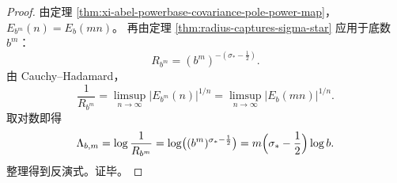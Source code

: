 \begin{proof}
由定理 \ref{thm:xi-abel-powerbase-covariance-pole-power-map}，\(E_{b^m}(n)=E_b(mn)\)。
再由定理 \ref{thm:radius-captures-sigma-star} 应用于底数 \(b^m\)：
\[
R_{b^m}=(b^m)^{-(\sigma_*-\frac12)}.
\]
由 Cauchy--Hadamard，
\[
\frac{1}{R_{b^m}}
=\limsup_{n\to\infty}|E_{b^m}(n)|^{1/n}
=\limsup_{n\to\infty}|E_b(mn)|^{1/n}.
\]
取对数即得
\[
\Lambda_{b,m}
=\log\frac{1}{R_{b^m}}
=\log\!\big((b^m)^{\sigma_*-\frac12}\big)
=m\Bigl(\sigma_*-\frac12\Bigr)\log b.
\]
整理得到反演式。证毕。
\end{proof}

\endinput
